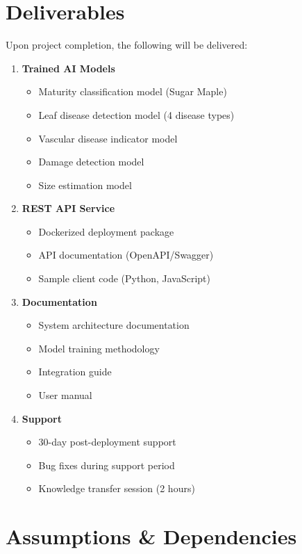 \documentclass[11pt,a4paper]{article}
\begin{document}
\section{Deliverables}

Upon project completion, the following will be delivered:

\begin{enumerate}[leftmargin=*]
\item \textbf{Trained AI Models}
\begin{itemize}
\item Maturity classification model (Sugar Maple)
\item Leaf disease detection model (4 disease types)
\item Vascular disease indicator model
\item Damage detection model
\item Size estimation model
\end{itemize}

\item \textbf{REST API Service}
\begin{itemize}
\item Dockerized deployment package
\item API documentation (OpenAPI/Swagger)
\item Sample client code (Python, JavaScript)
\end{itemize}

\item \textbf{Documentation}
\begin{itemize}
\item System architecture documentation
\item Model training methodology
\item Integration guide
\item User manual
\end{itemize}

\item \textbf{Support}
\begin{itemize}
\item 30-day post-deployment support
\item Bug fixes during support period
\item Knowledge transfer session (2 hours)
\end{itemize}
\end{enumerate}

\section{Assumptions \& Dependencies}
\end{document}
